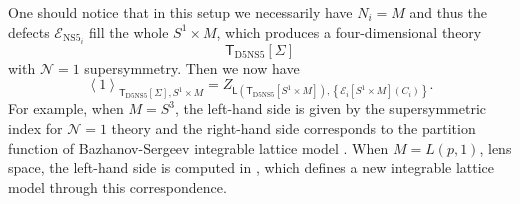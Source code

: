 One should notice that in this setup we necessarily have $N_{i}=M$
and thus the defects $\mathcal{E}_{\mathrm{NS}5_{i}}$ fill the whole
$S^{1}\times M$, which produces a four-dimensional theory 
\[
\mathsf{T}_{\mathrm{D5NS5}}\left[\Sigma\right]
\]
with $\mathcal{N}=1$ supersymmetry. Then we now have 
\begin{equation}
  \left\langle  1  \right\rangle_{\mathsf{T}_{\mathrm{D5NS5}}\left[\Sigma\right], S^{1}\times M}  
    =Z_{\mathsf{L}\left(\mathsf{T}_{\mathrm{D5NS5}}\left[S^{1}\times M\right]\right),\left\{ \mathcal{E}_{i}\left[S^{1}\times M\right]\left(C_{i}\right)\right\} }.
\end{equation}
For example, when $M=S^{3}$, the left-hand side is given by the supersymmetric
index for $\mathcal{N}=1$ theory and the right-hand side corresponds
to the partition function of Bazhanov-Sergeev integrable lattice model
\cite{Bazhanov:2010kz,Bazhanov:2011mz,Spiridonov:2010em,Yamazaki:2012cp}. When $M=L\left(p,1\right)$,
lens space, the left-hand side is computed in \cite{Yamazaki:2013nra}, which
defines a new integrable lattice model through this correspondence. 

